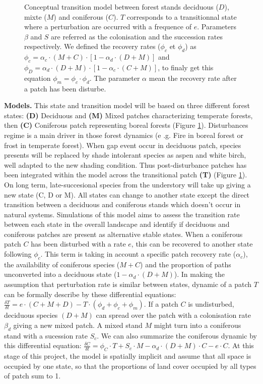 
\begin{figure}         
	
	\caption{Conceptual transition model between forest stands deciduous ($D$),
	mixte ($M$) and coniferous ($C$). $T$ corresponds to a transitionnal state
	where a perturbation are occurred with a frequence of $e$. Parameters $\beta$
	and $S$ are referred as the colonisation and the succession rates
	respectively. We defined the recovery rates ($\phi_c$ et $\phi_d$) as $\phi_c
	= \alpha_c \cdot (M+C) \cdot [1- \alpha_d \cdot (D +M)]$ and $\phi_D =
	\alpha_d \cdot (D+M) \cdot [1- \alpha_c \cdot (C +M)]$, to finaly get this
	equation $\phi_m = \phi_c \cdot \phi_d$. The parameter $\alpha$ mean the
	recovery rate after a patch has been disturbe.}         
	\label{Model}
\end{figure}

\textbf{Models.} This state and transition model will be based on three
different forest states: \textbf{(D)} Deciduous and \textbf{(M)} Mixed patches
characterizing temperate forests, then \textbf{(C)} Coniferous patch
representing boreal forests (Figure \ref{Model}). Disturbances regime is a main
driver in those forest dynamics (e .g. Fire in boreal forest or frost in
temperate forest). When gap event occur in deciduous patch, species presents
will be replaced by shade intolerant species as aspen and white birch, well
adapted to the new shading condition. Thus post-disturbance patches has been
integrated within the model across the transitional patch \textbf{(T)} (Figure
\ref{Model}).  On long term, late-succesional species from the understory will
take up giving a new state (C, D or M). All states can change to another state
except the direct transition between a deciduous and coniferous stands which
doesn't occur in natural systems. Simulations of this model aims to assess the
transition rate between each state in the overall landscape and identify if
deciduous and coniferous patches are present as alternative stable states. When
a coniferous patch $C$ has been disturbed with a rate $e$, this can be recovered
to another state following $\phi_c$. This term is taking in account a specific
patch recovery rate ($\alpha_{c}$), the availability of coniferous species
($M+C$) and the proportion of paths unconverted into a deciduous state ($1-
\alpha_d \cdot (D +M)$). In making the assumption that perturbation rate is
similar between states, dynamic of a patch $T$ can be formally describe by these
differential equations: $\frac{\delta T}{\delta t} = e \cdot (C+M+D) - T \cdot
(\phi_d + \phi_c + \phi_m)$. If a patch $C$ is undisturbed, deciduous species
$(D+M)$ can spread over the patch with a colonisation rate $\beta_d$ giving a
new mixed patch. A mixed stand $M$ might turn into a coniferous stand with a
sucession rate $S_c$.  We can also summarize the coniferous dynamic by this
differential equation: $\frac{\delta C}{\delta t} = \phi_C \cdot T + S_c \cdot M
- \alpha_d \cdot (D+M)\cdot C - e \cdot C$. At this stage of this project, the
model is spatially implicit and assume that all space is occupied by one state,
so that the proportions of land cover occupied by all types of patch sum to 1.
\\

